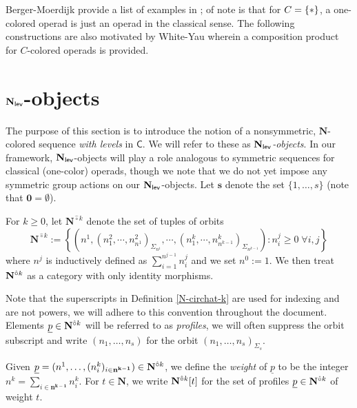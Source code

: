 Berger-Moerdijk provide a list of examples in \cite[]{BM-trees}; of note is that for $C=\{*\}$, a one-colored operad is just an operad in the classical sense. The following constructions are also motivated by White-Yau \cite{White-Yau} wherein a composition product for $C$-colored operads is provided.


\section{$\mathbf{N}_{\mathsf{lev}}$-objects}
The purpose of this section is to introduce the notion of a nonsymmetric, $\mathbf{N}$-colored sequence \textit{with levels} in $\mathsf{C}$. We will refer to these as \textit{$\mathbf{N}_{\mathsf{lev}}$-objects}. %
In our framework, $\mathbf{N}_{\mathsf{lev}}$-objects will play a role analogous to symmetric sequences for classical (one-color) operads, though we note that we do not yet impose any symmetric group actions on our $\mathbf{N}_{\mathsf{lev}}$-objects. Let $\mathbf{s}$ denote the set $\{1,\dots,s\}$ (note that $\mathbf{0}=\emptyset$). 

\begin{definition} 
\label{N-circhat-k}
For $k\geq 0$, let $\mathbf{N}^{\hat{\circ}k}$ denote the set of tuples of orbits
\[ 
\mathbf{N}^{\hat{\circ}k}:=\left\{ \left(n^1,(n^2_1,\cdots,n^2_{n^1})_{\Sigma_{n^1}} , \cdots, (n^{k}_1,\cdots, n^k_{n^{k-1}})_{\Sigma_{n^{k-1}}}\right): n^j_i \geq 0\; \forall i,j\right\}
\]
where $n^{j}$ is inductively defined as $\sum_{i=1}^{n^{j-1}} n^j_i$ and we set $n^0:=1$. We then treat $\mathbf{N}^{\hat{\circ}k}$ as a category with only identity morphisms. 
\end{definition}

Note that the superscripts in Definition \ref{N-circhat-k} are used for indexing and are not powers, we will adhere to this convention throughout the document. %
Elements $\underline{p}\in \mathbf{N}^{\hat{\circ}k}$ will be referred to as \textit{profiles}, we will often suppress the orbit subscript and write $(n_1,\dots,n_s)$ for the orbit $(n_1,\dots,n_s)_{\Sigma_s}$.

\begin{definition} Given $\underline{p}=(n^1, \dots, (n^{k}_i)_{i\in \mathbf{n^{k-1}}})\in \mathbf{N}^{\hat{\circ}k}$, we define the \textit{weight} of $\underline{p}$ to be the integer
$n^k=\sum_{i\in \mathbf{n^{k-1}}} n^k_i$. For $t\in \mathbf{N}$, we write $\mathbf{N}^{\hat{\circ}k}[t]$ for the set of profiles $\underline{p}\in \mathbf{N}^{\hat{\circ}k}$ of weight $t$.
\end{definition} 

